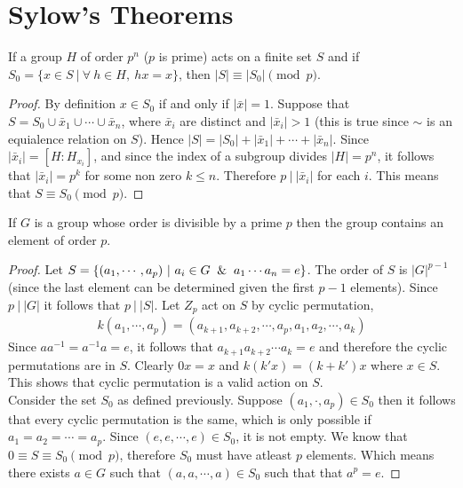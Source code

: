 \section{Sylow's Theorems}
\begin{lemma}
  If a group $H$ of order $p^n$ ($p$ is prime) acts on a finite set $S$ and if $S_0 = \{x\in S\ |\ \forall\ h\in H,\ hx = x\}$, then $|S| \equiv |S_0| \pmod{p}$.
\end{lemma}
\begin{proof}
  By definition $x\in S_0$ if and only if $|\bar{x}| = 1$. Suppose that $S = S_0 \cup \bar{x}_1 \cup \cdots \cup \bar{x}_n$, where $\bar{x}_i$ are distinct and $|\bar{x}_i|>1$ (this is true since $\sim$ is an equialence relation on $S$). Hence $|S| = |S_0| + |\bar{x}_1| + \cdots +|\bar{x}_n|$. Since $|\bar{x}_i| = [H:H_{x_i}]$, and since the index of a subgroup divides $|H| = p^n$, it follows that $|\bar{x}_i| = p^k$ for some non zero $k\leq n$. Therefore $p\ |\ |\bar{x}_i|$ for each $i$. This means that $S \equiv  S_0 \pmod{p}$.
\end{proof}
\begin{theorem}
  If $G$ is a group whose order is divisible by a prime $p$ then the group contains an element of order $p$.
\end{theorem}
\begin{proof}
  Let $S = \{(a_1,\cdots, a_p)\ |\ a_i\in G \And a_1\cdots a_n = e\}$. The order of $S$ is $|G|^{p-1}$ (since the last element can be determined given the first $p-1$ elements). Since $p\ |\ |G|$ it follows that $p\ |\ |S|$. Let $Z_p$ act on $S$ by cyclic permutation,
  \begin{align*}
    k(a_1,\cdots, a_p) = (a_{k+1}, a_{k+2}, \cdots, a_p, a_1, a_2, \cdots, a_{k})
  \end{align*}
  Since $aa^{-1} = a^{-1}a =e$, it follows that $a_{k+1}a_{k+2}\cdots a_k = e$ and therefore the cyclic permutations are in $S$. Clearly $0x = x$ and $k(k'x) = (k+k')x$ where $x\in S$. This shows that cyclic permutation is a valid action on $S$.\\

  Consider the set $S_0$ as defined previously. Suppose $(a_1,\cdot, a_p) \in S_0$ then it follows that every cyclic permutation is the same, which is only possible if $a_1=a_2= \cdots = a_p$. Since $(e,e,\cdots, e) \in S_0$, it is not empty. We know that $0 \equiv S \equiv S_0 \pmod{p}$, therefore $S_0$ must have atleast $p$ elements. Which means there exists $a\in G$ such that $(a,a,\cdots,a)\in S_0$ such that that $a^p = e$.
\end{proof}
